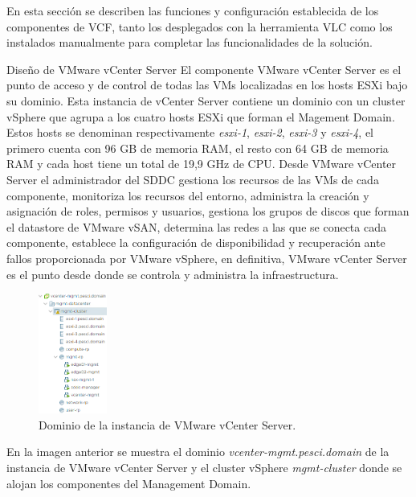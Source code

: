 En esta sección se describen las funciones y configuración establecida de los componentes de VCF, tanto los desplegados con la herramienta VLC como los instalados manualmente para completar las funcionalidades de la solución.

\begin{subsubsection}{Diseño de VMware vCenter Server}
  \label{subsubsec:diseno-vcenter}
El componente VMware vCenter Server es el punto de acceso y de control de todas las VMs localizadas en los hosts ESXi bajo su dominio. Esta instancia de vCenter Server contiene un dominio con un cluster vSphere que agrupa a los cuatro hosts ESXi que forman el Magement Domain. Estos hosts se denominan respectivamente \textit{esxi-1}, \textit{esxi-2}, \textit{esxi-3} y \textit{esxi-4}, el primero cuenta con 96 GB de memoria RAM, el resto con 64 GB de memoria RAM y cada host tiene un total de 19,9 GHz de CPU. Desde VMware vCenter Server el administrador del SDDC gestiona los recursos de las VMs de cada componente, monitoriza los recursos del entorno, administra la creación y asignación de roles, permisos y usuarios, gestiona los grupos de discos que forman el datastore de VMware vSAN, determina las redes a las que se conecta cada componente, establece la configuración de disponibilidad y recuperación ante fallos proporcionada por VMware vSphere, en definitiva, VMware vCenter Server es el punto desde donde se controla y administra la infraestructura.
\begin{figure}[h]
  \centering
  \includegraphics[width=0.2\textwidth]{imaxes/pruebaconcepto/clusterVCenterServer.png}
  \caption{Dominio de la instancia de VMware vCenter Server.}
  \label{fig:cluster-vCenter-Server}
\end{figure}
\FloatBarrier
En la imagen anterior se muestra el dominio \textit{vcenter-mgmt.pesci.domain} de la instancia de VMware vCenter Server y el cluster vSphere \textit{mgmt-cluster} donde se alojan los componentes del Management Domain. 

\end{subsubsection}
